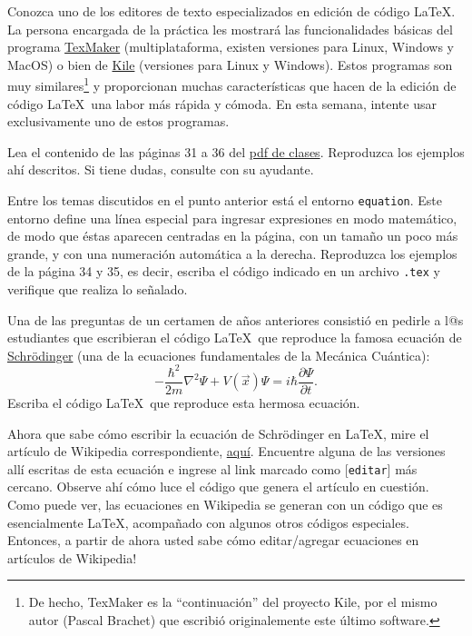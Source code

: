 \documentclass[11pt]{exam}
\begin{document}
\begin{questions}
\item Conozca uno de los editores de texto especializados en edición de código \LaTeX. La persona encargada de la práctica les mostrará las funcionalidades básicas del programa \href{http://www.xm1math.net/texmaker/}{TexMaker} (multiplataforma, existen versiones para Linux, Windows y MacOS) o bien de \href{https://kile.sourceforge.io/}{Kile} (versiones para Linux y Windows). Estos programas son muy similares\footnote{De hecho, TexMaker es la ``continuación'' del proyecto Kile, por el mismo autor (Pascal Brachet) que escribió originalemente este último software.} y proporcionan muchas características que hacen de la edición de código \LaTeX\, una labor más rápida y cómoda. En esta semana, intente usar exclusivamente uno de estos programas.

\item Lea el contenido de las páginas 31 a 36 del \href{https://udec.instructure.com/courses/62342/pages/latex-pdf-presentacion?module_item_id=2334210}{pdf de clases}. Reproduzca los ejemplos ahí descritos. Si tiene dudas, consulte con su ayudante.

\item Entre los temas discutidos en el punto anterior está el entorno \texttt{equation}. Este entorno define una línea especial para ingresar expresiones en modo matemático, de modo que éstas aparecen centradas en la página, con un tamaño un poco más grande, y con una numeración automática a la derecha. Reproduzca los ejemplos de la página 34 y 35, es decir, escriba el código indicado en un archivo \texttt{.tex} y verifique que realiza lo señalado.

\item Una de las preguntas de un certamen de a\~nos anteriores consistió en pedirle a l@s estudiantes que escribieran el código \LaTeX\ que reproduce la famosa ecuación de \href{https://es.wikipedia.org/wiki/Erwin_Schr\%C3\%B6dinger}{Schr\"odinger} (una de la ecuaciones fundamentales de la Mecánica Cuántica):
\begin{equation}
-\frac{\hbar^2}{2m}\nabla^2\Psi+V(\vec{x})\Psi=i\hbar\frac{\partial\Psi}{\partial t}.
\end{equation}
Escriba el código \LaTeX\ que reproduce esta hermosa ecuación.

\item Ahora que sabe cómo escribir la ecuación de Schr\"odinger en \LaTeX, mire el artículo de Wikipedia correspondiente, \href{https://es.wikipedia.org/wiki/Ecuaci\%C3\%B3n_de_Schr\%C3\%B6dinger}{aquí}. Encuentre alguna de las versiones allí escritas de esta ecuación e ingrese al link marcado como [\texttt{editar}] más cercano. Observe ahí cómo luce el código que genera el artículo en cuestión. Como puede ver, las ecuaciones en Wikipedia se generan con un código que es esencialmente \LaTeX, acompa\~nado con algunos otros códigos especiales. Entonces, a partir de ahora usted sabe cómo editar/agregar ecuaciones en artículos de Wikipedia!


\end{questions}
\end{document}
